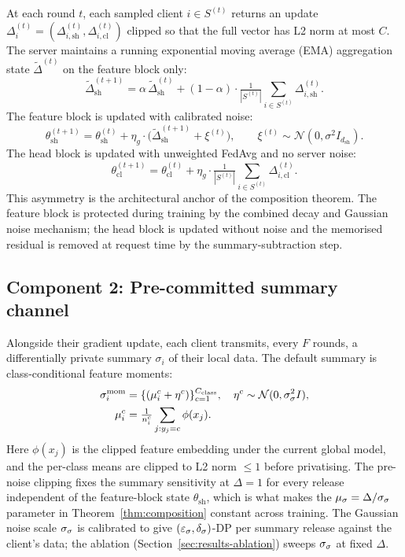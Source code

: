 At each round $t$, each sampled client $i \in S^{(t)}$ returns an update
$\Delta_i^{(t)} = (\Delta_{i,\mathrm{sh}}^{(t)}, \Delta_{i,\mathrm{cl}}^{(t)})$
clipped so that the full vector has L2 norm at most $C$. The server
maintains a running exponential moving average (EMA) aggregation state
$\tilde\Delta^{(t)}$ on the feature block only:
\begin{equation}
\tilde\Delta_\mathrm{sh}^{(t+1)}
  = \alpha\, \tilde\Delta_\mathrm{sh}^{(t)}
  + (1-\alpha) \cdot
     \tfrac{1}{|S^{(t)}|} \sum_{i \in S^{(t)}} \Delta_{i,\mathrm{sh}}^{(t)}.
\label{eq:decay-state}
\end{equation}
The feature block is updated with calibrated noise:
\begin{equation}
\theta_\mathrm{sh}^{(t+1)}
  = \theta_\mathrm{sh}^{(t)}
  + \eta_g \cdot \big(\tilde\Delta_\mathrm{sh}^{(t+1)} + \xi^{(t)}\big),
\qquad \xi^{(t)} \sim \mathcal{N}(0, \sigma^2 I_{d_\mathrm{sh}}).
\label{eq:feature-update}
\end{equation}
The head block is updated with unweighted FedAvg and no server noise:
\begin{equation}
\theta_\mathrm{cl}^{(t+1)}
  = \theta_\mathrm{cl}^{(t)}
  + \eta_g \cdot
     \tfrac{1}{|S^{(t)}|} \sum_{i \in S^{(t)}} \Delta_{i,\mathrm{cl}}^{(t)}.
\label{eq:head-update}
\end{equation}
This asymmetry is the architectural anchor of the composition theorem.
The feature block is protected during training by the combined decay and
Gaussian noise mechanism; the head block is updated without noise and the
memorised residual is removed at request time by the summary-subtraction
step.

\subsection{Component 2: Pre-committed summary channel}
\label{sec:method-summary}

Alongside their gradient update, each client transmits, every $F$ rounds, a
differentially private summary $\sigma_i$ of their local data. The default
summary is class-conditional feature moments:
\begin{align}
\sigma_i^{\mathrm{mom}} &= \{(\mu_i^c + \eta^c)\}_{c=1}^{C_\mathrm{class}},\quad \eta^c \sim \mathcal{N}(0, \sigma_\sigma^2 I), \nonumber \\
\mu_i^c &= \tfrac{1}{n_i^c} \sum_{j: y_j = c} \phi(x_j).
\label{eq:summary-moments}
\end{align}
Here $\phi(x_j)$ is the clipped feature embedding under the current global
model, and the per-class means are clipped to L2 norm $\le 1$ before
privatising. The pre-noise clipping fixes the summary sensitivity at
$\Delta = 1$ for every release independent of the feature-block state
$\theta_\mathrm{sh}$, which is what makes the $\mu_\sigma = \Delta /
\sigma_\sigma$ parameter in Theorem~\ref{thm:composition} constant across
training. The Gaussian noise scale $\sigma_\sigma$ is calibrated to
give $(\varepsilon_\sigma, \delta_\sigma)$-DP per summary release against the
client's data; the ablation (Section~\ref{sec:results-ablation}) sweeps
$\sigma_\sigma$ at fixed $\Delta$.

